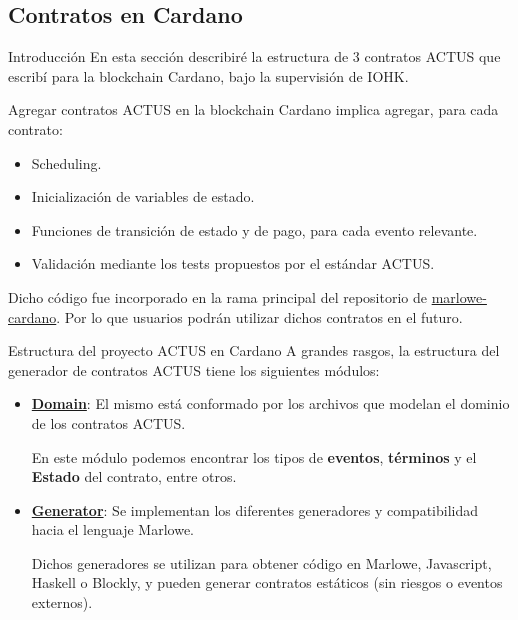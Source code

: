 \documentclass{beamer}
\newcommand{\nologo}{\setbeamertemplate{logo}{}} %
\begin{document}
\subsection{Contratos en Cardano}

{\nologo
\begin{frame}{Introducción}
En esta sección describiré la estructura de 3 contratos ACTUS que escribí para la blockchain Cardano, bajo la supervisión de IOHK.\@

\vfill
\pause

Agregar contratos ACTUS en la blockchain Cardano implica agregar, para cada contrato:

\begin{itemize}
        \pause
    \item Scheduling.
        \pause
    \item Inicialización de variables de estado.
        \pause
    \item Funciones de transición de estado y de pago, para cada evento relevante.
        \pause
    \item Validación mediante los tests propuestos por el estándar ACTUS.
\end{itemize}

\pause
\vfill

Dicho código fue incorporado en la rama principal del repositorio de \href{https://github.com/input-output-hk/marlowe-cardano}{marlowe-cardano}. Por lo que usuarios podrán utilizar dichos contratos en el futuro.
\end{frame}
}

\begin{frame}[fragile]{Estructura del proyecto ACTUS en Cardano}
A grandes rasgos, la estructura del generador de contratos ACTUS tiene los siguientes módulos:
    \vfill
    
\begin{itemize}
    \item  \textbf{\underline{Domain}}: El mismo está conformado por los archivos que modelan el dominio de los contratos ACTUS.

        \medskip

        En este módulo podemos encontrar los tipos de \textbf{eventos}, \textbf{términos} y el \textbf{Estado} del contrato, entre otros.
        \pause
        \vfill

    \item \textbf{\underline{Generator}}: Se implementan los diferentes generadores y compatibilidad hacia el lenguaje Marlowe. 

        \medskip

        Dichos generadores se utilizan para obtener código en Marlowe, Javascript, Haskell o Blockly, y pueden generar contratos estáticos (sin riesgos o eventos externos).
\end{itemize}
\end{frame}
\end{document}
